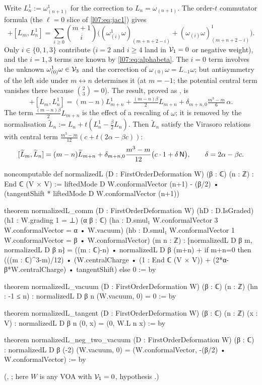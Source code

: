 Write $L^1_n := \omega^1_{(n+1)}$ for the correction to $L_n = \omega_{(n+1)}$. The order-$t$ commutator
formula (the $\ell = 0$ slice of \eqref{l07:eq:jac1}) gives
\begin{equation*}
 [L^1_m,L_n] + [L_m,L^1_n] = \sum_{i\ge0}\binom{m+1}{i}\Big((\omega^1_{(i)}\omega)_{(m+n+2-i)}
   + (\omega_{(i)}\omega)^1_{(m+n+2-i)}\Big).
\end{equation*}
Only $i\in\{0,1,3\}$ contribute ($i = 2$ and $i\ge4$ land in $\mathcal{V}_1 = 0$ or negative weight), and the
$i = 1,3$ terms are known by \eqref{l07:eq:alphabeta}. The $i = 0$ term involves the unknown
$\omega^1_{(0)}\omega\in\mathcal{V}_3$ and the correction of $\omega_{(0)}\omega = L_{-1}\omega$; but
antisymmetry of the left side under $m\leftrightarrow n$ determines it (at $m = -1$; the potential
central term vanishes there because $\binom{2}{3} = 0$). The result, proved as
, is
\begin{equation*}
 [L^1_m,L_n]+[L_m,L^1_n] = (m-n)L^1_{m+n} + \tfrac{(m-n)\beta}{2}L_{m+n}
 + \delta_{m+n,0}\tfrac{m^3-m}{6}\,\alpha .
\end{equation*}
The term $\frac{(m-n)\beta}2L_{m+n}$ is the effect of a rescaling of $\omega$; it is removed by the
normalisation $\widetilde L_n := L_n + t(L^1_n - \frac\beta2L_n)$. Then $\widetilde L_n$ satisfy the Virasoro
relations with central term $\frac{m^3-m}{12}(c + t(2\alpha-\beta c))$:
\begin{equation}\label{l07:eq:normcomm}
 [\widetilde L_m,\widetilde L_n] = (m-n)\widetilde L_{m+n} + \delta_{m+n,0}\frac{m^3-m}{12}\big(c\cdot1 + \delta\,\mathsf{N}\big),
 \qquad \delta = 2\alpha-\beta c .
\end{equation}
\begin{leancode}
noncomputable def normalizedL (D : FirstOrderDeformation W) (β : ℂ) (n : ℤ) : End ℂ (V × V) :=
  liftedMode D W.conformalVector (n+1) -
    (β/2) • (tangentShift * liftedMode D W.conformalVector (n+1))

theorem normalizedL_comm (D : FirstOrderDeformation W) (hD : D.IsGraded)
    (h1 : W.grading 1 = ⊥) (α β : ℂ)
    (ha : D.smul₁ W.conformalVector 3 W.conformalVector = α • W.vacuum)
    (hb : D.smul₁ W.conformalVector 1 W.conformalVector = β • W.conformalVector)
    (m n : ℤ) :
    ⁅normalizedL D β m, normalizedL D β n⁆ =
      ((m : ℂ)-n) • normalizedL D β (m+n) +
      if m+n=0 then (((m : ℂ)^3-m)/12) •
        (W.centralCharge • (1 : End ℂ (V × V)) +
          (2*α-β*W.centralCharge) • tangentShift) else 0 := by

theorem normalizedL_vacuum (D : FirstOrderDeformation W) (β : ℂ)
    (n : ℤ) (hn : -1 ≤ n) : normalizedL D β n (W.vacuum, 0) = 0 := by

theorem normalizedL_tangent (D : FirstOrderDeformation W) (β : ℂ) (n : ℤ) (x : V) :
    normalizedL D β n (0, x) = (0, W.L n x) := by

theorem normalizedL_neg_two_vacuum (D : FirstOrderDeformation W) (β : ℂ) :
    normalizedL D β (-2) (W.vacuum, 0) =
      (W.conformalVector, -(β/2) • W.conformalVector) := by
\end{leancode}
(, ; here $W$ is
any VOA with $\mathcal{V}_1 = 0$, hypothesis .)

